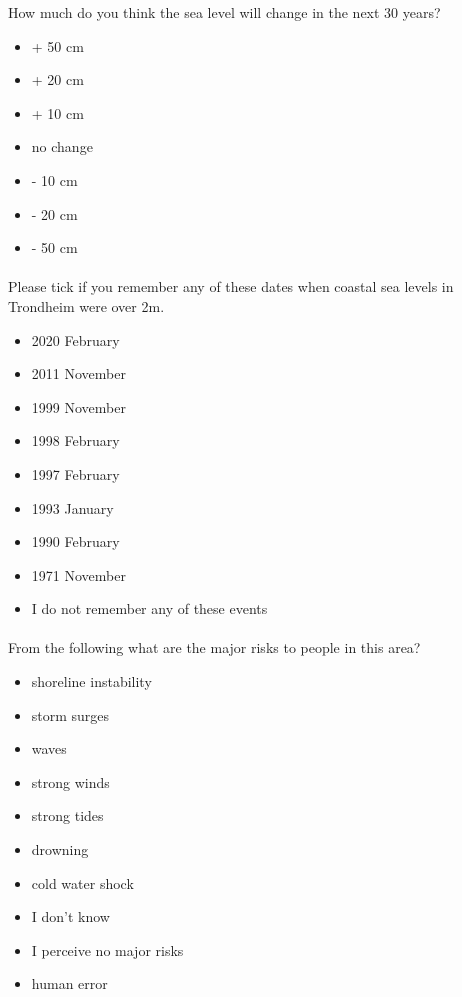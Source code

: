 How much do you think the sea level will change in the next 30 years?
\begin{itemize}
    \item + 50 cm
    \item + 20 cm
    \item + 10 cm
    \item no change
    \item - 10 cm
    \item - 20 cm 
    \item - 50 cm 
\end{itemize}
\paragraph{}

Please tick if you remember any of these dates when coastal sea levels in Trondheim were over 2m.
\begin{itemize}
    \item 2020 February
    \item 2011 November
    \item 1999 November
    \item 1998 February
    \item 1997 February
    \item 1993 January
    \item 1990 February
    \item 1971 November
    \item I do not remember any of these events
\end{itemize}
\paragraph{}

From the following what are the major risks to people in this area?
\begin{itemize}
    \item shoreline instability
    \item storm surges
    \item waves
    \item strong winds
    \item strong tides
    \item drowning
    \item cold water shock
    \item I don't know
    \item I perceive no major risks
    \item human error
\end{itemize}
